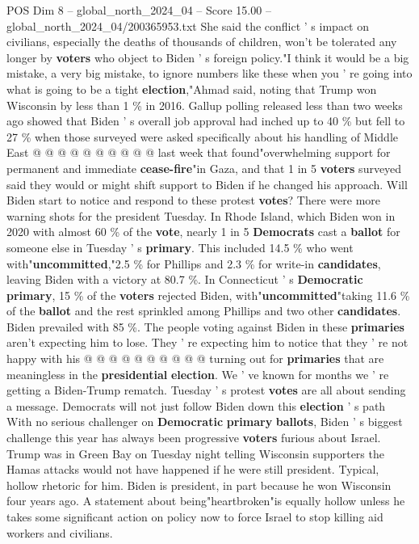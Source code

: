 \begin{textsample}{POS Dim 8 – global\_north\_2024\_04 – Score 15.00 – global\_north\_2024\_04/200365953.txt}
She said the conflict ' s impact on civilians, especially the deaths of thousands of children, won't be tolerated any longer by \textbf{voters} who object to Biden ' s foreign policy."I think it would be a big mistake, a very big mistake, to ignore numbers like these when you ' re going into what is going to be a tight \textbf{election},"Ahmad said, noting that Trump won Wisconsin by less than 1 \% in 2016.
Gallup polling released less than two weeks ago showed that Biden ' s overall job approval had inched up to 40 \% but fell to 27 \% when those surveyed were asked specifically about his handling of Middle East @ @ @ @ @ @ @ @ @ @ last week that found"overwhelming support for permanent and immediate \textbf{cease-fire}"in Gaza, and that 1 in 5 \textbf{voters} surveyed said they would or might shift support to Biden if he changed his approach.
Will Biden start to notice and respond to these protest \textbf{votes}?
There were more warning shots for the president Tuesday.
In Rhode Island, which Biden won in 2020 with almost 60 \% of the \textbf{vote}, nearly 1 in 5 \textbf{Democrats} cast a \textbf{ballot} for someone else in Tuesday ' s \textbf{primary}.
This included 14.5 \% who went with"\textbf{uncommitted},"2.5 \% for Phillips and 2.3 \% for write-in \textbf{candidates}, leaving Biden with a victory at 80.7 \%.
In Connecticut ' s \textbf{Democratic} \textbf{primary}, 15 \% of the \textbf{voters} rejected Biden, with"\textbf{uncommitted}"taking 11.6 \% of the \textbf{ballot} and the rest sprinkled among Phillips and two other \textbf{candidates}.
Biden prevailed with 85 \%.
The people voting against Biden in these \textbf{primaries} aren't expecting him to lose.
They ' re expecting him to notice that they ' re not happy with his @ @ @ @ @ @ @ @ @ @ turning out for \textbf{primaries} that are meaningless in the \textbf{presidential} \textbf{election}.
We ' ve known for months we ' re getting a Biden-Trump rematch.
Tuesday ' s protest \textbf{votes} are all about sending a message.
Democrats will not just follow Biden down this \textbf{election} ' s path With no serious challenger on \textbf{Democratic} \textbf{primary} \textbf{ballots}, Biden ' s biggest challenge this year has always been progressive \textbf{voters} furious about Israel.
Trump was in Green Bay on Tuesday night telling Wisconsin supporters the Hamas attacks would not have happened if he were still president.
Typical, hollow rhetoric for him.
Biden is president, in part because he won Wisconsin four years ago.
A statement about being"heartbroken"is equally hollow unless he takes some significant action on policy now to force Israel to stop killing aid workers and civilians.

\end{textsample}
